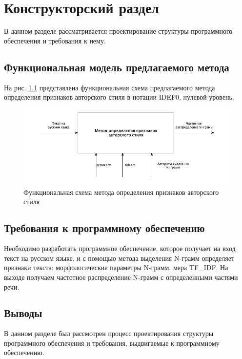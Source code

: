 \chapter{Конструкторский раздел}
\label{cha:design}

В данном разделе рассматривается проектирование структуры программного обеспечения и требования к нему.

\section{Функциональная модель предлагаемого метода}

На рис. \ref{fig:idef0} представлена функциональная схема предлагаемого метода 
определения признаков авторского стиля в нотации IDEF0, нулевой уровень.

\begin{figure}[H]
    \centering
    \includegraphics[scale=0.5]{img/idef0.png}
    \caption{Функциональная схема метода определения признаков авторского стиля}
    \label{fig:idef0}
\end{figure}

\section{Требования к программному обеспечению}

Необходимо разработать программное обеспечение, которое получает на вход текст на русском языке, и с помощью метода выделения N-грамм определяет признаки текста: морфологические параметры N-грамм, мера TF\_IDF. На выходе получаем частотное распределение N-грамм с определенными частями речи.

\section{Выводы}

В данном разделе был рассмотрен процесс проектирования структуры программного обеспечения и требования, выдвигаемые  к программному обеспечению.
